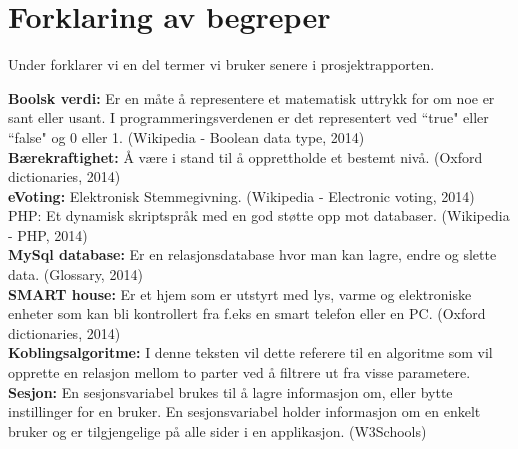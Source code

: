 \section{Forklaring av begreper}

Under forklarer vi en del termer vi bruker senere i prosjektrapporten.

{\bf Boolsk verdi:} Er en måte å representere et matematisk uttrykk for om noe er sant eller usant. I programmeringsverdenen er det representert ved ``true" eller ``false" og 0 eller 1. (Wikipedia - Boolean data type, 2014)\\

{\bf Bærekraftighet:} Å være i stand til å opprettholde et bestemt nivå. (Oxford dictionaries, 2014)\\

{\bf eVoting:} Elektronisk Stemmegivning. (Wikipedia - Electronic voting, 2014)
PHP:  Et dynamisk skriptspråk med en god støtte opp mot databaser. (Wikipedia - PHP, 2014)\\

{\bf MySql database:} Er en relasjonsdatabase hvor man kan lagre, endre og slette data. (Glossary, 2014)\\

{\bf SMART house:} Er et hjem som er utstyrt med lys, varme og elektroniske enheter som kan bli kontrollert fra f.eks en smart telefon eller en PC. (Oxford dictionaries, 2014)\\

{\bf Koblingsalgoritme:}  I denne teksten vil dette referere til en algoritme som vil opprette en relasjon mellom to parter ved å filtrere ut fra visse parametere.\\

{\bf Sesjon:} En sesjonsvariabel brukes til å lagre informasjon om, eller bytte instillinger for en bruker. En sesjonsvariabel holder informasjon om en enkelt bruker og er tilgjengelige på alle sider i en applikasjon. (W3Schools)
